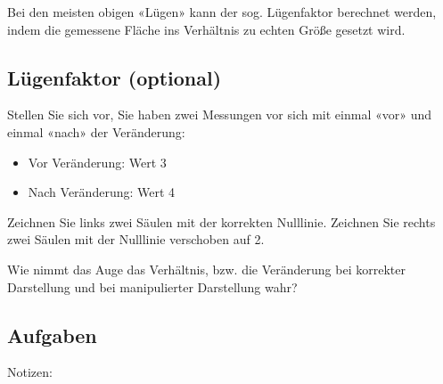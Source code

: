 Bei den meisten obigen «Lügen» kann der sog. Lügenfaktor berechnet werden, indem die gemessene Fläche ins Verhältnis zu echten Größe gesetzt wird.
\newpage
\subsection*{Lügenfaktor (optional)}
Stellen Sie sich vor, Sie haben zwei Messungen vor sich mit einmal «vor» und einmal «nach» der Veränderung:
\begin{itemize}
\item Vor Veränderung: Wert 3
\item Nach Veränderung: Wert 4
\end{itemize}

Zeichnen Sie links zwei Säulen mit der korrekten Nulllinie. Zeichnen Sie rechts zwei Säulen mit der Nulllinie verschoben auf 2.


Wie nimmt das Auge das Verhältnis, bzw. die Veränderung bei korrekter Darstellung und bei manipulierter Darstellung wahr?

\newpage

\subsection*{Aufgaben}

Notizen:


\newpage
